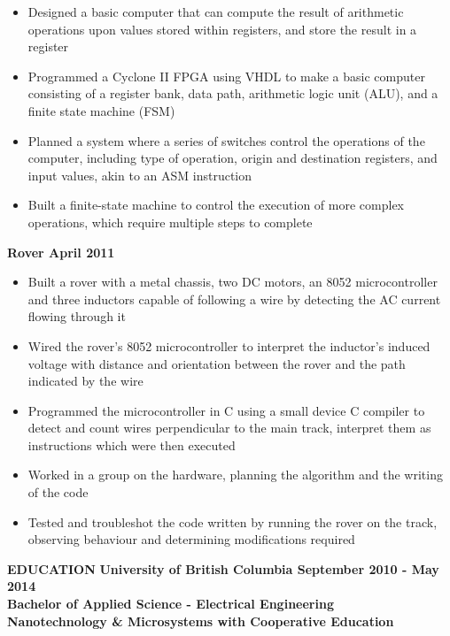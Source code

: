 \documentclass[letterpaper]{article}\usepackage[margin=0.5in]{geometry}
\begin{document}
\begin{itemize}
\itemsep0em
\item	
Designed a basic computer that can compute the result of arithmetic operations upon values stored within registers, and store the result in a register
\item	
Programmed a Cyclone II FPGA using VHDL to make a basic computer consisting of a register bank, data path, arithmetic logic unit (ALU), and a finite state machine (FSM)
\item	
Planned a system where a series of switches control the operations of the computer, including type of operation, origin and destination registers, and input values, akin to an ASM instruction
\item	
Built a finite-state machine to control the execution of more complex operations, which require multiple steps to complete

\end{itemize}

\vspace{5 mm}
\textbf{Rover \hfill April 2011}							
\begin{itemize}
\itemsep0em
	\item
	Built a rover with a metal chassis, two DC motors, an 8052 microcontroller and three inductors capable of following a wire by detecting the AC current flowing through it
	\item
	Wired the rover's 8052 microcontroller to interpret the inductor's induced voltage with distance and orientation between the rover and the path indicated by the wire
	\item
	Programmed the microcontroller in C using a small device C compiler to detect and count wires perpendicular to the main track, interpret them as instructions which were then executed
	\item
	Worked in a group on the hardware, planning the algorithm and the writing of the code
	\item
	Tested and troubleshot the code written by running the rover on the track, observing behaviour and determining modifications required
\end{itemize}
	
\vspace{10 mm}
\Large{\textbf{EDUCATION}} 
\normalsize
\textbf{
\flushleft
University of British Columbia
\hfill
	September 2010 - May 2014
\\
	Bachelor of Applied Science - Electrical Engineering \\ 
	\hspace{10 mm}
	Nanotechnology \& Microsystems with Cooperative Education
}
\end{document}
